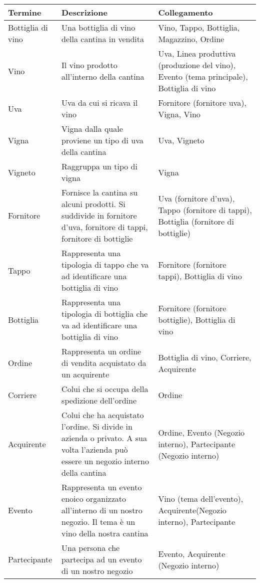 \begin{center}
	\begin{tabular}{P{2cm}P{8cm}P{4cm}}
		\toprule
		 Termine & Descrizione & Collegamento \\
		\midrule
		Bottiglia di vino & Una bottiglia di vino della cantina in vendita & Vino, Tappo, Bottiglia, Magazzino, Ordine\\
		\midrule
		Vino & Il vino prodotto all'interno della cantina & Uva, Linea produttiva (produzione del vino), Evento (tema principale), Bottiglia di vino \\
		\midrule
		Uva & Uva da cui si ricava il vino &  Fornitore (fornitore uva), Vigna, Vino\\
		\midrule
		Vigna & Vigna dalla quale proviene un tipo di uva della cantina &  Uva, Vigneto\\
		\midrule
		Vigneto & Raggruppa un tipo di vigna &  Vigna\\
		\midrule
		Fornitore & Fornisce la cantina su alcuni prodotti. Si suddivide in fornitore d'uva, fornitore di tappi, fornitore di bottiglie &  Uva (fornitore d'uva), Tappo (fornitore di tappi), Bottiglia (fornitore di bottiglie)\\
		\midrule
		Tappo & Rappresenta una tipologia di tappo che va ad identificare una bottiglia di vino &  Fornitore (fornitore tappi), Bottiglia di vino\\
		\midrule
		Bottiglia & Rappresenta una tipologia di bottiglia che va ad identificare una bottiglia di vino &  Fornitore (fornitore bottiglie), Bottiglia di vino\\
		\midrule
		Ordine & Rappresenta un ordine di vendita acquistato da un acquirente &  Bottiglia di vino, Corriere, Acquirente\\
		\midrule
		Corriere & Colui che si occupa della spedizione dell'ordine &  Ordine\\
		\midrule
		Acquirente & Colui che ha acquistato l'ordine. Si divide in azienda o privato. A sua volta l'azienda può essere un negozio interno della cantina &  Ordine, Evento (Negozio interno), Partecipante (Negozio interno)\\
		\midrule
		Evento & Rappresenta un evento enoico organizzato all'interno di un nostro negozio. Il tema è un vino della nostra cantina  &  Vino (tema dell'evento), Acquirente(Negozio interno), Partecipante\\
		\midrule
		Partecipante & Una persona che partecipa ad un evento di un nostro negozio &  Evento, Acquirente (Negozio interno)\\

\end{tabular}
\end{center}
